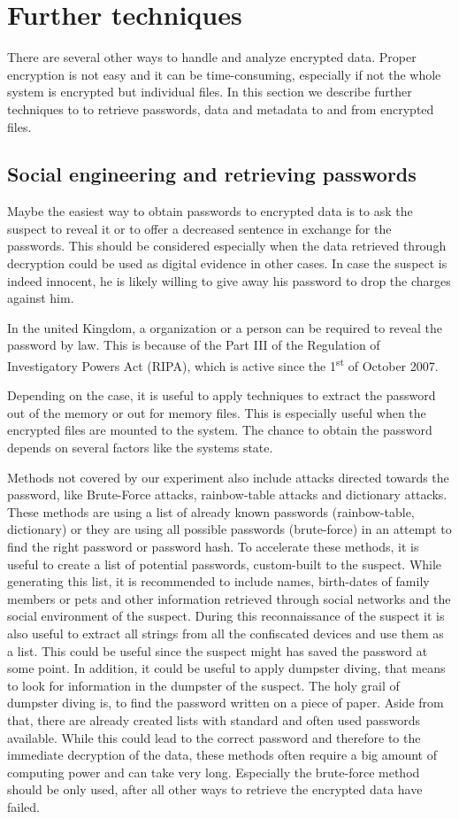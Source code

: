 \section{Further techniques}
There are several other ways to handle and analyze encrypted data. Proper encryption is not easy and it can be time-consuming, especially if not the whole system is encrypted but individual files. In this section we describe further techniques to to retrieve passwords, data and metadata to and from encrypted files.
\subsection{Social engineering and retrieving passwords}
Maybe the easiest way to obtain passwords to encrypted data is to ask the suspect to reveal it or to offer a decreased sentence in exchange for the passwords.
This should be considered especially when the data retrieved through decryption could be used as digital evidence in other cases.
In case the suspect is indeed innocent, he is likely willing to give away his password to drop the charges against him.

In the united Kingdom, a organization or a person can be required to reveal the password by law. This is because of the Part III of the Regulation of Investigatory Powers Act (RIPA), which is active since  the 1\textsuperscript{st} of October 2007.\cite{lowman2010effect}

Depending on the case, it is useful to apply techniques to extract the password out of the memory or out for memory files. This is especially useful when the encrypted files are mounted to the system. The chance to obtain the password depends on several factors like the systems state.\cite{MaartmannMoe2009S132}

Methods not covered by our experiment also include attacks directed towards the password, like Brute-Force attacks, rainbow-table attacks and dictionary attacks. These methods are using a list of already known passwords (rainbow-table, dictionary) or they are using all possible passwords (brute-force) in an attempt to find the right password or password hash.
To accelerate these methods, it is useful to create a list of potential passwords, custom-built to the suspect. While generating this list, it is recommended to include names, birth-dates of family members or pets and other information retrieved through social networks and the social environment of the suspect. During this reconnaissance of the suspect it is also useful to extract all strings from all the confiscated devices and use them as a list. This could be useful since the suspect might has saved the password at some point. In addition, it could be useful to apply dumpster diving, that means to look for information in the dumpster of the suspect. 
The holy grail of dumpster diving is, to find the password written on a piece of paper. 
Aside from that, there are already created lists with standard and often used passwords available.
While this could lead to the correct password and therefore to the immediate decryption of the data, these methods often require a big amount of
computing power and can take very long.
Especially the brute-force method should be only used, after all other ways to retrieve the encrypted data have failed.

